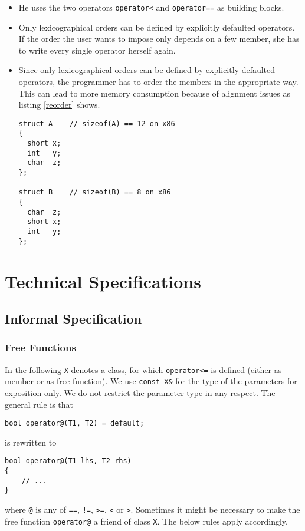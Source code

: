 ﻿\documentclass[a4paper,11pt,final]{article}
\newcommand{\tcode}[1]{\lstinline[basicstyle=\normalsize\ttfamily]{#1}}
\numberwithin{equation}{subsection}
\begin{document}
\begin{itemize}
\item He uses the two operators \tcode{operator<} and \tcode{operator==} as building blocks.
\item Only lexicographical orders can be defined by explicitly defaulted operators. If the order the user wants to impose only depends on a few member, she has to write every single operator herself again.
\item Since only lexicographical orders can be defined by explicitly defaulted operators, the programmer has to order the members in the appropriate way. This can lead to more memory consumption because of alignment issues as listing \ref{reorder} shows.
\begin{lstlisting}[caption=Different order of members leads to different size in memory,label=reorder]
struct A    // sizeof(A) == 12 on x86 
{
  short x;
  int   y;
  char  z;
};

struct B    // sizeof(B) == 8 on x86
{
  char  z;
  short x;
  int   y; 
};
\end{lstlisting}

\end{itemize}

\section{Technical Specifications}
\subsection{Informal Specification}
\subsubsection{Free Functions}
In the following \verb|X| denotes a class, for which \verb|operator<=| is defined (either as member or as free function). We use \verb|const X&| for the type of the parameters for exposition only. We do not restrict the parameter type in any respect. The general rule is that
\begin{verbatim}
bool operator@(T1, T2) = default;
\end{verbatim}
is rewritten to
\begin{verbatim}
bool operator@(T1 lhs, T2 rhs)
{
    // ...
}
\end{verbatim}
where \verb|@| is any of \verb|==|, \verb|!=|, \verb|>=|, \verb|<| or \verb|>|. Sometimes it might be necessary to make the free function \verb|operator@| a friend of class \verb|X|. The below rules apply accordingly.
\end{document}
